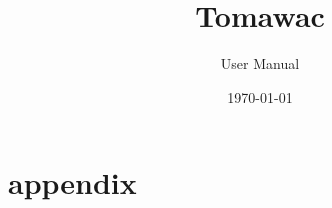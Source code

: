 \documentclass[Tomawac]{../../data/TelemacDoc} %
\begin{document}
\let\cleardoublepage\clearpage

\title{Tomawac}
\subtitle{User Manual}
\version{\telmaversion}
\date{\today}
\maketitle
\clearpage



\newpage

\thispagestyle{empty}

\TelemacCopyright{}



\pagestyle{empty} %

\tableofcontents%


\pagestyle{fancy} %










\newpage
\appendix
\chapter{appendix}









\end{document}
